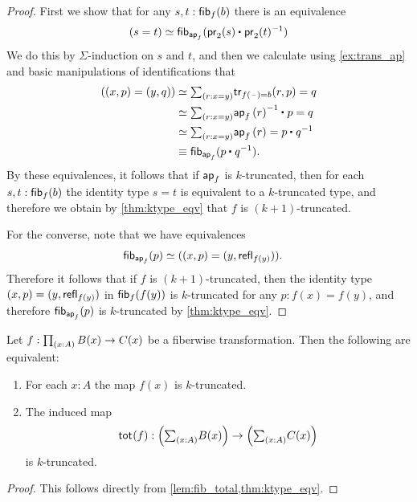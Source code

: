 \begin{proof}
First we show that for any $s,t:\mathsf{fib}_{f}(b)$ there is an equivalence
\begin{equation*}
\eqv{(s=t)}{\fib{\apfunc{f}}{\ct{\proj 2(s)}{\proj 2(t)^{-1}}}}
\end{equation*}
We do this by $\Sigma$-induction on $s$ and $t$, and then we calculate using \cref{ex:trans_ap} and basic manipulations of identifications that
\begin{align*}
(\pairr{x,p}=\pairr{y,q}) & \eqvsym \sm{r:x=y} \mathsf{tr}_{f(\blank)=b}(r,p)=q \\
& \eqvsym \sm{r:x=y} \ct{\ap{f}{r}^{-1}}{p}=q \\
& \eqvsym \sm{r:x=y} \ap{f}{r}=\ct{p}{q^{-1}} \\
& \jdeq \fib{\apfunc{f}}{\ct{p}{q^{-1}}}.
\end{align*}
By these equivalences, it follows that if $\mathsf{ap}_{f}$ is $k$-truncated, then for each $s,t:\mathsf{fib}_{f}(b)$ the identity type $s=t$ is equivalent to a $k$-truncated type, and therefore we obtain by \cref{thm:ktype_eqv} that $f$ is $(k+1)$-truncated.

For the converse, note that we have equivalences
\begin{align*}
\mathsf{fib}_{\mathsf{ap}_{f}}(p) & \simeq ((x,p)=(y,\mathsf{refl}_{f(y)})).
\end{align*}
Therefore it follows that if $f$ is $(k+1)$-truncated, then the identity type $(x,p)=(y,\mathsf{refl}_{f(y)})$ in $\mathsf{fib}_{f}(f(y))$ is $k$-truncated for any $p:f(x)=f(y)$, and therefore $\mathsf{fib}_{\mathsf{ap}_{f}}(p)$ is $k$-truncated by \cref{thm:ktype_eqv}. 
\end{proof}

\begin{thm}
Let $f:\prd{x:A}B(x)\to C(x)$ be a fiberwise transformation. Then the following are equivalent:
\begin{enumerate}
\item For each $x:A$ the map $f(x)$ is $k$-truncated.
\item The induced map 
\begin{equation*}
\total{f}:\Big(\sm{x:A}B(x)\Big)\to\Big(\sm{x:A}C(x)\Big)
\end{equation*}
is $k$-truncated.
\end{enumerate}
\end{thm}

\begin{proof}
This follows directly from \cref{lem:fib_total,thm:ktype_eqv}.
\end{proof}

